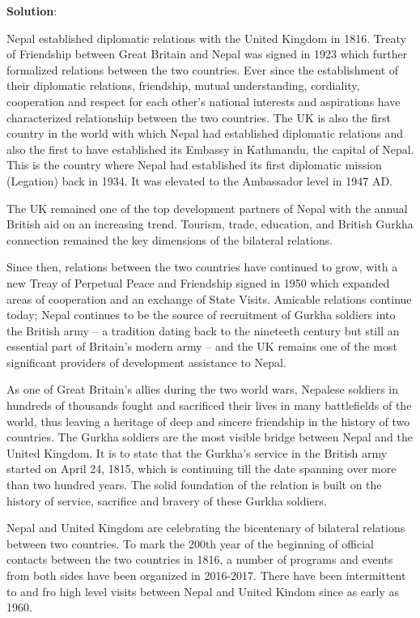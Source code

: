 \documentclass[
  openany]{book}
\newenvironment{solution}{ {\bfseries Solution}:}{}
\begin{document}
\begin{solution}

Nepal established diplomatic relations with the United Kingdom in 1816. Treaty of Friendship between Great Britain and Nepal was signed in 1923 which further formalized relations between the two countries. Ever since the establishment of their diplomatic relations, friendship, mutual understanding, cordiality, cooperation and respect for each other's national interests and aspirations have characterized relationship between the two countries. The UK is also the first country in the world with which Nepal had established diplomatic relations and also the first to have established its Embassy in Kathmandu, the capital of Nepal. This is the country where Nepal had established its first diplomatic mission (Legation) back in 1934. It was elevated to the Ambassador level in 1947 AD.

The UK remained one of the top development partners of Nepal with the annual British aid on an increasing trend. Tourism, trade, education, and British Gurkha connection remained the key dimensions of the bilateral relations.

Since then, relations between the two countries have continued to grow, with a new Treay of Perpetual Peace and Friendship signed in 1950 which expanded areas of cooperation and an exchange of State Visits. Amicable relations continue today; Nepal continues to be the source of recruitment of Gurkha soldiers into the British army -- a tradition dating back to the nineteeth century but still an essential part of Britain's modern army -- and the UK remains one of the most significant providers of development assistance to Nepal.

As one of Great Britain's allies during the two world wars, Nepalese soldiers in hundreds of thousands fought and sacrificed their lives in many battlefields of the world, thus leaving a heritage of deep and sincere friendship in the history of two countries. The Gurkha soldiers are the most visible bridge between Nepal and the United Kingdom. It is to state that the Gurkha's service in the British army started on April 24, 1815, which is continuing till the date spanning over more than two hundred years. The solid foundation of the relation is built on the history of service, sacrifice and bravery of these Gurkha soldiers.

Nepal and United Kingdom are celebrating the bicentenary of bilateral relations between two countries. To mark the 200th year of the beginning of official contacts between the two countries in 1816, a number of programs and events from both sides have been organized in 2016-2017. There have been intermittent to and fro high level visits between Nepal and United Kindom since as early as 1960.


\end{solution}
\end{document}
